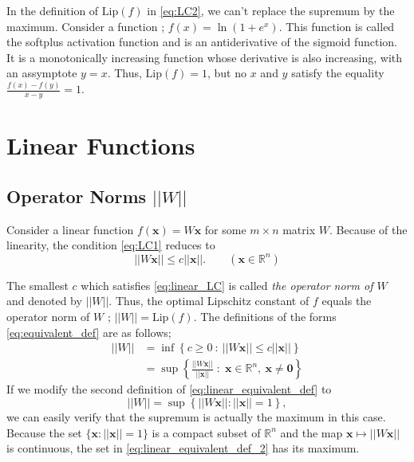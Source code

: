\documentclass[11pt]{report}
\newcommand\bs[1]{\ensuremath{\boldsymbol{#1}}}
\newcommand\bx{\ensuremath{\boldsymbol x}}
\newcommand\lip{\ensuremath{\text{Lip}}}
\begin{document}
In the definition of \(\lip(f)\) in \eqref{eq:LC2}, we can't replace the supremum by the maximum.
Consider a function ; \(f(x)=\ln(1+e^x)\).
This function is called the softplus activation function and is an antiderivative of the sigmoid function.
It is a monotonically increasing function whose derivative is also increasing, with an assymptote \(y=x\).
Thus, \(\lip(f)=1\), but no \(x\) and \(y\) satisfy the equality \(\frac{f(x)-f(y)}{x-y}=1\).

\section{Linear Functions}

%
\subsection{Operator Norms \(||W||\)}

Consider a linear function \(f(\bx)=W\bx\) for some \(m\times n\) matrix \(W\).
Because of the linearity, the condition \eqref{eq:LC1} reduces to
\begin{equation}\label{eq:linear_LC}
||W\bx||\le c||\bx||.\qquad(\bx\in\mathbb R^n)
\end{equation}

The smallest \(c\) which satisfies \eqref{eq:linear_LC} is called \emph{the operator norm of \(W\)} and denoted by \(||W||\).
Thus, the optimal Lipschitz constant of \(f\) equals the operator norm of \(W\) ; \(||W||=\lip(f)\).
The definitions of the forms \eqref{eq:equivalent_def} are as follows;
\begin{equation}\label{eq:linear_equivalent_def}\begin{aligned}
||W||
&=\inf\left\{c\ge0\::\: ||W\bx||\le c||\bx||\right\}\\
&=\sup\left\{\frac{||W\bx||}{||\bx||}\;:\;\bx\in\mathbb R^n,\:\bx\neq\bs0\right\}
\end{aligned}\end{equation}
If we modify the second definition of \eqref{eq:linear_equivalent_def} to
\begin{equation}\label{eq:linear_equivalent_def_2}
||W||=\sup\left\{||W\bx||:||\bx||=1\right\},
\end{equation}
we can easily verify that the supremum is actually the maximum in this case.
Because the set \(\{\bx:||\bx||=1\}\) is a compact subset of \(\mathbb R^n\) and the map \(\bx\mapsto||W\bx||\) is continuous, the set in \eqref{eq:linear_equivalent_def_2} has its maximum.
\end{document}
